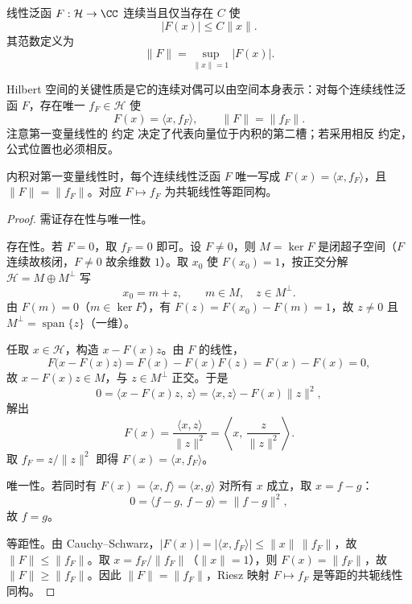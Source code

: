 \begin{definition}[连续线性泛函]
线性泛函 $F:\mathcal H\to\CC$ 连续当且仅当存在 $C$ 使
\[
|F(x)|\le C\|x\|.
\]
其范数定义为
\[
\|F\|=\sup_{\|x\|=1}|F(x)|.
\]
\end{definition}

\begin{theorem}[Riesz 表示]
Hilbert 空间的关键性质是它的连续对偶可以由空间本身表示：对每个连续线性泛函 $F$，存在唯一 $f_F\in\mathcal H$ 使
\[
\boxed{F(x)=\langle x,f_F\rangle},
\qquad
\|F\|=\|f_F\|.
\]
注意第一变量线性的 约定 决定了代表向量位于内积的第二槽；若采用相反 约定，公式位置也必须相反。
\end{theorem}

\begin{theorem}
内积对第一变量线性时，每个连续线性泛函 $F$ 唯一写成 $F(x)=\langle x,f_F\rangle$，且 $\|F\|=\|f_F\|$。对应 $F\mapsto f_F$ 为共轭线性等距同构。
\end{theorem}
\begin{proof}
需证存在性与唯一性。

存在性。若 $F=0$，取 $f_F=0$ 即可。设 $F\neq0$，则 $M=\ker F$ 是闭超子空间（$F$ 连续故核闭，$F\neq0$ 故余维数 $1$）。取 $x_0$ 使 $F(x_0)=1$，按正交分解 $\mathcal H=M\oplus M^\perp$ 写
\begin{equation*}
 x_0=m+z,
 \qquad m\in M,\quad z\in M^\perp.
\end{equation*}
由 $F(m)=0$（$m\in\ker F$），有 $F(z)=F(x_0)-F(m)=1$，故 $z\neq0$ 且 $M^\perp=\operatorname{span}\{z\}$（一维）。

任取 $x\in\mathcal H$，构造 $x-F(x)z$。由 $F$ 的线性，
\begin{equation*}
 F\bigl(x-F(x)z\bigr)=F(x)-F(x)F(z)=F(x)-F(x)=0,
\end{equation*}
故 $x-F(x)z\in M$，与 $z\in M^\perp$ 正交。于是
\begin{equation*}
 0=\langle x-F(x)z,\,z\rangle
 =\langle x,z\rangle-F(x)\|z\|^2,
\end{equation*}
解出
\begin{equation*}
 F(x)=\frac{\langle x,z\rangle}{\|z\|^2}
 =\left\langle x,\,\frac{z}{\|z\|^2}\right\rangle.
\end{equation*}
取 $f_F=z/\|z\|^2$ 即得 $F(x)=\langle x,f_F\rangle$。

唯一性。若同时有 $F(x)=\langle x,f\rangle=\langle x,g\rangle$ 对所有 $x$ 成立，取 $x=f-g$：
\begin{equation*}
 0=\langle f-g,\,f-g\rangle=\|f-g\|^2,
\end{equation*}
故 $f=g$。

等距性。由 Cauchy--Schwarz，$|F(x)|=|\langle x,f_F\rangle|\le\|x\|\,\|f_F\|$，故 $\|F\|\le\|f_F\|$。取 $x=f_F/\|f_F\|$（$\|x\|=1$），则 $F(x)=\|f_F\|$，故 $\|F\|\ge\|f_F\|$。因此 $\|F\|=\|f_F\|$，Riesz 映射 $F\mapsto f_F$ 是等距的共轭线性同构。
\end{proof}


